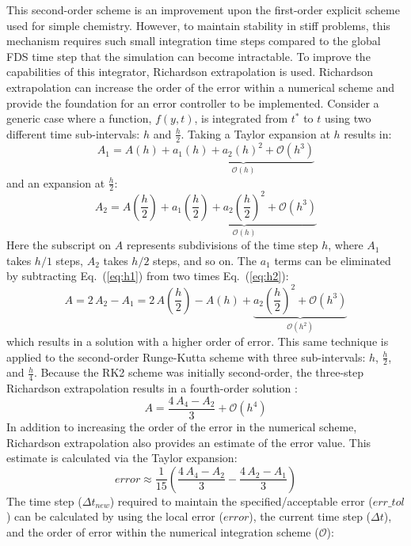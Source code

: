 This second-order scheme is an improvement upon the first-order explicit scheme used for simple chemistry. However, to maintain stability in stiff problems, this mechanism requires such small integration time steps compared to the global FDS time step that the simulation can become intractable. To improve the capabilities of this integrator, Richardson extrapolation is used. Richardson extrapolation can increase the order of the error within a numerical scheme and provide the foundation for an error controller to be implemented. Consider a generic case where a function, $f(y,t)$, is integrated from $t^*$ to $t$ using two different time sub-intervals: $h$ and $\frac{h}{2}$. Taking a Taylor expansion at $h$ results in:
\begin{equation}\label{eq:h1}
A_1={A(h)} + \underbrace{a_{1}(h) + a_{2}(h)^2 + \mathcal{O}(h^3)}_{\mathcal{O}(h)}
\end{equation}
and an expansion at $\frac{h}{2}$:
\begin{equation}\label{eq:h2}
A_2=A(\frac{h}{2}) + \underbrace{a_{1}(\frac{h}{2}) + a_{2}(\frac{h}{2})^2 + \mathcal{O}(h^3)}_{\mathcal{O}(h)}
\end{equation}
Here the subscript on $A$ represents subdivisions of the time step $h$, where $A_1$ takes $h/1$ steps, $A_2$ takes $h/2$ steps, and so on. The $a_{1}$ terms can be eliminated by subtracting Eq.~(\ref{eq:h1}) from two times Eq.~(\ref{eq:h2}):
\begin{equation}\label{eq:A2}
A=2\,A_2-A_1 = 2\,A(\frac{h}{2}) - A(h) + \underbrace{a_{2}(\frac{h}{2})^2 + \mathcal{O}(h^3)}_{\mathcal{O}(h^2)}
\end{equation}
which results in a solution with a higher order of error. This same technique is applied to the second-order Runge-Kutta scheme with three sub-intervals: $h$, $\frac{h}{2}$, and $\frac{h}{4}$. Because the RK2 scheme was initially second-order, the three-step Richardson extrapolation results in a fourth-order solution \cite{Moin:2001}:
\begin{equation}\label{eq:A4}
A=\frac{4\,A_4-A_2}{3}  + \mathcal{O}(h^4)
\end{equation}
In addition to increasing the order of the error in the numerical scheme, Richardson extrapolation also provides an estimate of the error value. This estimate is calculated via the Taylor expansion:
\begin{equation}\label{eq:error}
error \approx \frac{1}{15}(\frac{4\,A_4-A_2}{3} - \frac{4\,A_2-A_1}{3})
\end{equation}  
The time step ($\Delta t_{new}$) required to maintain the specified/acceptable error ($err\_tol$) can be calculated by using the local error ($error$), the current time step ($\Delta t$), and the order of error within the numerical integration scheme ($\mathcal{O}$):
